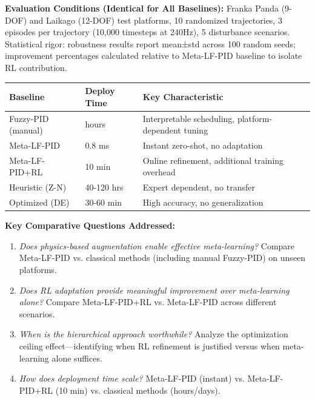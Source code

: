 \documentclass[DTMColor]{ROB-New}
\begin{document}
\textbf{Evaluation Conditions (Identical for All Baselines):} Franka Panda (9-DOF) and Laikago (12-DOF) test platforms, 10 randomized trajectories, 3 episodes per trajectory (10,000 timesteps at 240Hz), 5 disturbance scenarios. Statistical rigor: robustness results report mean±std across 100 random seeds; improvement percentages calculated relative to Meta-LF-PID baseline to isolate RL contribution.

\begin{table}[h]
{\begin{fntable}\centering
\begin{tabular}{@{\extracolsep{\fill}}lll}
\hline
\textbf{Baseline} & \textbf{Deploy Time} & \textbf{Key Characteristic} \\
\hline
Fuzzy-PID (manual) & hours & Interpretable scheduling, platform-dependent tuning \\
Meta-LF-PID & 0.8 ms & Instant zero-shot, no adaptation \\
Meta-LF-PID+RL & 10 min & Online refinement, additional training overhead \\
Heuristic (Z-N) & 40-120 hrs & Expert dependent, no transfer \\
Optimized (DE) & 30-60 min & High accuracy, no generalization \\
\hline
\end{tabular}
\end{fntable}}
\end{table}

\textbf{Key Comparative Questions Addressed:}
\begin{enumerate}[leftmargin=*, itemsep=2pt]
    \item \textit{Does physics-based augmentation enable effective meta-learning?} Compare Meta-LF-PID vs. classical methods (including manual Fuzzy-PID) on unseen platforms.
    \item \textit{Does RL adaptation provide meaningful improvement over meta-learning alone?} Compare Meta-LF-PID+RL vs. Meta-LF-PID across different scenarios.
    \item \textit{When is the hierarchical approach worthwhile?} Analyze the optimization ceiling effect—identifying when RL refinement is justified versus when meta-learning alone suffices.
    \item \textit{How does deployment time scale?} Meta-LF-PID (instant) vs. Meta-LF-PID+RL (10 min) vs. classical methods (hours/days).
\end{enumerate}
\end{document}
